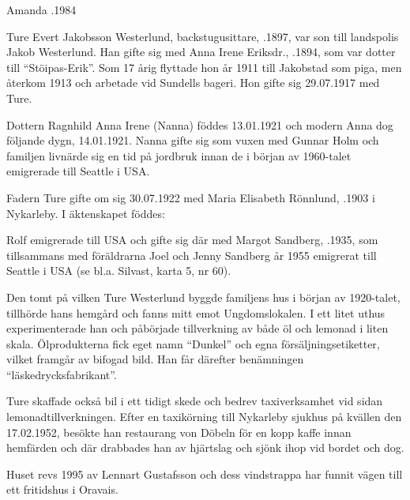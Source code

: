 Amanda .1984





Ture Evert Jakobsson Westerlund, backstugusittare,  .1897, var son till landspolis Jakob Westerlund. Han gifte sig med Anna Irene Eriksdr., .1894, som var dotter till ``Stöipas-Erik''.
Som 17 årig flyttade hon år 1911 till Jakobstad som piga, men återkom 1913 och arbetade vid Sundells bageri. Hon gifte sig 29.07.1917 med Ture.

Dottern Ragnhild Anna Irene (Nanna) föddes 13.01.1921 och modern Anna dog följande dygn, 14.01.1921. Nanna gifte sig som vuxen med Gunnar Holm och familjen livnärde sig en tid på jordbruk innan de i början av 1960-talet emigrerade till Seattle i USA.

Fadern Ture gifte om sig 30.07.1922 med Maria Elisabeth Rönnlund, .1903 i Nykarleby. I äktenskapet föddes:
\begin{jhchildren}
  \item {}
  \item {}
\end{jhchildren}
Rolf emigrerade till USA och gifte sig där med Margot Sandberg, .1935, som tillsammans med föräldrarna Joel och Jenny Sandberg år 1955 emigrerat till Seattle i USA (se bl.a. Silvast, karta 5, nr 60).

Den tomt på vilken Ture Westerlund byggde familjens hus i början av 1920-talet, tillhörde hans hemgård och fanns mitt emot Ungdomslokalen. I ett litet uthus experimenterade han och påbörjade tillverkning av både öl och lemonad i liten skala. Ölprodukterna fick eget namn ``Dunkel'' och egna försäljningsetiketter, vilket framgår av bifogad bild. Han får därefter benämningen ``läskedrycksfabrikant''.

Ture skaffade också bil i ett tidigt skede och bedrev taxiverksamhet vid sidan lemonadtillverkningen. Efter en taxikörning till Nykarleby sjukhus på kvällen den 17.02.1952, besökte han restaurang von Döbeln för en kopp kaffe innan hemfärden och där drabbades han av hjärtslag och sjönk ihop vid bordet och dog.

Huset revs 1995 av Lennart Gustafsson och dess vindstrappa har funnit vägen till ett fritidshus i Oravais.

